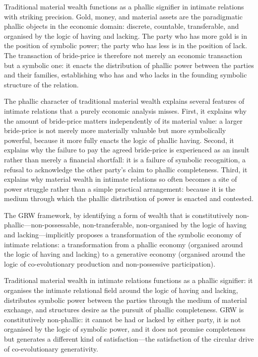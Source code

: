 Traditional material wealth functions as a phallic signifier in intimate relations with striking precision. Gold, money, and material assets are the paradigmatic phallic objects in the economic domain: discrete, countable, transferable, and organised by the logic of having and lacking. The party who has more gold is in the position of symbolic power; the party who has less is in the position of lack. The transaction of bride-price is therefore not merely an economic transaction but a symbolic one: it enacts the distribution of phallic power between the parties and their families, establishing who has and who lacks in the founding symbolic structure of the relation.

The phallic character of traditional material wealth explains several features of intimate relations that a purely economic analysis misses. First, it explains why the amount of bride-price matters independently of its material value: a larger bride-price is not merely more materially valuable but more symbolically powerful, because it more fully enacts the logic of phallic having. Second, it explains why the failure to pay the agreed bride-price is experienced as an insult rather than merely a financial shortfall: it is a failure of symbolic recognition, a refusal to acknowledge the other party's claim to phallic completeness. Third, it explains why material wealth in intimate relations so often becomes a site of power struggle rather than a simple practical arrangement: because it is the medium through which the phallic distribution of power is enacted and contested.

The GRW framework, by identifying a form of wealth that is constitutively non-phallic---non-possessable, non-transferable, non-organised by the logic of having and lacking---implicitly proposes a transformation of the symbolic economy of intimate relations: a transformation from a phallic economy (organised around the logic of having and lacking) to a generative economy (organised around the logic of co-evolutionary production and non-possessive participation).

\begin{claim}
Traditional material wealth in intimate relations functions as a phallic signifier: it organises the intimate relational field around the logic of having and lacking, distributes symbolic power between the parties through the medium of material exchange, and structures desire as the pursuit of phallic completeness. GRW is constitutively non-phallic: it cannot be had or lacked by either party, it is not organised by the logic of symbolic power, and it does not promise completeness but generates a different kind of satisfaction---the satisfaction of the circular drive of co-evolutionary generativity.
\end{claim}


